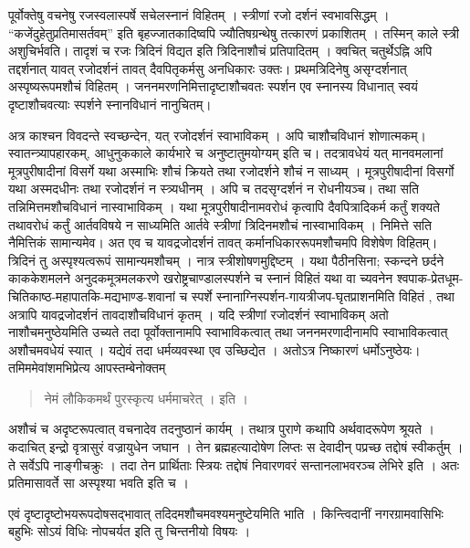 पूर्वोक्तेषु वचनेषु रजस्वलास्पर्षे सचेलस्नानं विहितम् । स्त्रीणां रजो दर्शनं स्वभावसिद्धम् । “कजेंदुहेतुप्रतिमासर्तवम्” इति बृहज्जातकादिष्वपि ज्यौतिषग्रन्थेषु तत्कारणं प्रकाशितम् । तस्मिन् काले स्त्री अशुचिर्भवति। तादृशं च रजः त्रिदिनं विद्यत इति त्रिदिनाशौचं प्रतिपादितम् । क्वचित् चतुर्थेऽह्नि अपि तद्दर्शनात् यावत् रजोदर्शनं तावत् दैवपितृकर्मसु अनधिकारः उक्तः। प्रथमत्रिदिनेषु असृग्दर्शनात् अस्पृष्यरूपमशौचं विहितम् । जननमरणनिमित्तादृष्टाशौचवतः स्पर्शन एव स्नानस्य विधानात् स्वयं दृष्टाशौचवत्याः स्पर्शने स्नानविधानं नानुचितम्।

अत्र काश्चन विवदन्ते स्वच्छन्देन, यत् रजोदर्शनं स्वाभाविकम् । अपि चाशौचविधानं शोणात्मकम्। स्वातन्त्र्यापहारकम्, आधुनुककाले कार्यभारे च अनुष्टातुमयोग्यम् इति च। तदत्रावधेयं यत् मानवमलानां मूत्रपुरीषादीनां विसर्गे यथा अस्माभिः शौचं क्रियते तथा रजोदर्शने शौचं न साध्यम् । मूत्रपुरीषादीनां विसर्गो यथा अस्मदधीनः तथा रजोदर्शनं न स्त्र्यधीनम् । अपि च तदसृग्दर्शनं न रोधनीयञ्च। तथा सति तन्निमित्तमशौचविधानं नास्वाभाविकम् । यथा मूत्रपुरीषादीनामवरोधं कृत्वापि दैवपित्रादिकर्म कर्तुं शक्यते तथावरोधं कर्तुं आर्तवविषये न साध्यमिति आर्तवे स्त्रीणां त्रिदिनमशौचं नास्वाभाविकम् । निमित्ते सति नैमित्तिकं सामान्यमेव। अत एव च यावद्रजोदर्शनं तावत् कर्मानधिकाररूपमशौचमपि विशेषेण विहितम्। त्रिदिनं तु अस्पृश्यत्वरूपं सामान्यमशौचम् । नात्र स्त्रीशोषणमुद्दिष्टम् । यथा पैठीनसिना; स्कन्दने छर्दने काककेशमलने अनुदकमूत्रमलकरणे खरोष्ट्रचाण्डालस्पर्शने च स्नानं विहितं यथा वा च्यवनेन श्वपाक-प्रेतधूम-चितिकाष्ठ-महापातकि-मद्यभाण्ड-शवानां च स्पर्शे स्नानाग्निस्पर्शन-गायत्रीजप-घृतप्राशनमिति विहितं , तथा अत्रापि यावद्रजोदर्शनं तावदाशौचविधानं कृतम् । यदि स्त्रीणां रजोदर्शनं स्वाभाविकम् अतो नाशौचमनुष्ठेयमिति उच्यते तदा पूर्वोक्तानामपि स्वाभाविकत्वात् तथा जननमरणादीनामपि स्वाभाविकत्वात् अशौचमवधेयं स्यात् । यद्येवं तदा धर्मव्यवस्था एव उच्छिद्येत । अतोऽत्र निष्कारणं धर्मोऽनुष्ठेयः। तमिममेवांशमभिप्रेत्य आपस्तम्बेनोक्तम् 

\begin{verse}
नेमं लौकिकमर्थं पुरस्कृत्य धर्ममाचरेत् । इति । 
\end{verse}
अशौचं च अदृष्टरूपत्वात् वचनादेव तदनुष्ठानं कार्यम् । तथात्र पुराणे कथापि अर्थवादरूपेण श्रूयते । कदाचित् इन्द्रो वृत्रासुरं वज्रायुधेन जघान । तेन ब्रह्महत्यादोषेण लिप्तः स देवादीन् पप्रच्छ तद्दोषं स्वीकर्तुम् । ते सर्वेऽपि नाङ्गीचक्रुः । तदा तेन प्रार्थिताः स्त्रियः तद्दोषं निवारणवरं सन्तानलाभवरञ्च लेभिरे इति । अतः प्रतिमासावर्ते सा अस्पृश्या भवति इति च । 

एवं दृष्टादृष्टोभयरूपदोषसद्भावात् तदिदमशौचमवश्यमनुष्टेयमिति भाति । किन्त्विदानीं नगरग्रामवासिभिः बहुभिः सोऽयं विधिः नोपचर्यत इति तु चिन्तनीयो विषयः ।

